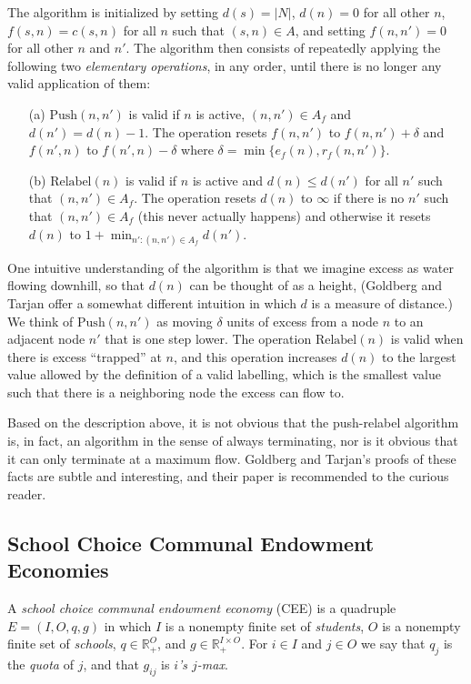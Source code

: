 \documentclass[12pt]{article}
\theoremstyle{definition}
\renewcommand{\Re}{\mathbb{R}}
\begin{document}
\begin{appendix}
The algorithm is initialized by setting $d(s) = |N|$, $d(n) = 0$ for
all other $n$, $f(s,n) = c(s,n)$ for all $n$ such that $(s,n) \in A$,
and setting $f(n,n') = 0$ for all other $n$ and $n'$.  The algorithm
then consists of repeatedly applying the following two
\emph{elementary operations}, in any order, until there is no longer
any valid application of them:
\begin{enumerate}
  \item[(a)] $\mathrm{Push}(n,n')$ is valid if $n$ is active, $(n,n')
    \in A_f$ and $d(n') = d(n) - 1$.  The operation resets $f(n,n')$
    to $f(n,n') + \delta$ and $f(n',n)$ to $f(n',n) - \delta$ where
    $\delta = \min\{e_f(n),r_f(n,n')\}$.
  \item[(b)] $\mathrm{Relabel}(n)$ is valid if $n$ is active and $d(n)
    \le d(n')$ for all $n'$ such that $(n,n') \in A_f$.  The operation
    resets $d(n)$ to $\infty$ if there is no $n'$ such that $(n,n')
    \in A_f$ (this never actually happens) and otherwise it resets
    $d(n)$ to $1 + \min_{n' : (n,n') \in A_f} d(n')$.
\end{enumerate}
One intuitive understanding of the algorithm is that we imagine excess
as water flowing downhill, so that $d(n)$ can be thought of as a
height, (Goldberg and Tarjan offer a somewhat different intuition in
which $d$ is a measure of distance.) We think of $\mathrm{Push}(n,n')$
as moving $\delta$ units of excess from a node $n$ to an adjacent node
$n'$ that is one step lower.  The operation $\mathrm{Relabel}(n)$ is
valid when there is excess ``trapped'' at $n$, and this operation
increases $d(n)$ to the largest value allowed by the definition of a
valid labelling, which is the smallest value such that there is a
neighboring node the excess can flow to.

Based on the description above, it is not obvious that the
push-relabel algorithm is, in fact, an algorithm in the sense of
always terminating, nor is it obvious that it can only terminate at a
maximum flow.  Goldberg and Tarjan's proofs of these facts are subtle
and interesting, and their paper is recommended to the curious reader.

\subsection{School Choice Communal Endowment Economies} \label{subsec:Algorithms}

A \emph{school choice communal endowment economy} (CEE) is a quadruple
$E = (I,O,q,g)$ in which $I$ is a nonempty finite set of
\emph{students}, $O$ is a nonempty finite set of \emph{schools}, $q
\in \Re_+^O$, and $g \in \Re_+^{I \times O}$.  For $i \in I$ and $j
\in O$ we say that $q_j$ is the \emph{quota} of $j$, and that $g_{ij}$
is \emph{$i$'s $j$-max}.


\end{appendix}
\end{document}
